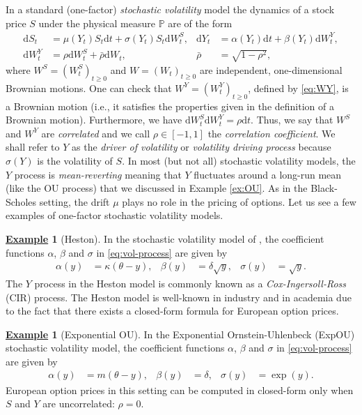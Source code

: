 \documentclass[12pt]{book}
\numberwithin{equation}{chapter}
\theoremstyle{plain}
\numberwithin{theorem}{section}
\theoremstyle{definition}
\newtheorem{example}[theorem]{\underline{Example}}
\numberwithin{exercise}{chapter}
\newcommand{\<}{\langle}
\renewcommand{\>}{\rangle}
\renewcommand{\(}{\left(}
\renewcommand{\)}{\right)}
\renewcommand{\[}{\left[}
\renewcommand{\]}{\right]}
\newcommand\Pb{\mathds{P}}
\newcommand\sig{\sigma}
\newcommand\rhob{\bar{\rho}}
\newcommand\dd{\mathrm{d}}
\theoremstyle{definition}
\numberwithin{question}{section}
\begin{document}
In a standard (one-factor) \textit{stochastic volatility} model the dynamics of a stock price $S$ under the physical measure $\Pb$ are of the form
\begin{align}
\dd S_t 
	&= \mu(Y_t) S_t \dd t + \sigma(Y_t) S_t \dd W_t^S , &
\dd Y_t 
	&= \alpha (Y_t) \dd t + \beta(Y_t) \dd W_t^Y , \label{eq:vol-process} \\
\dd W_t^Y 
	&=	\rho \dd W_t^S + \rhob \dd W_t , &
\rhob
	&=	\sqrt{1-\rho^2} , \label{eq:WY}
\end{align}
where $W^S = (W_t^S)_{t \geq 0}$ and $W = (W_t)_{t \geq 0}$ are independent, one-dimensional Brownian motions.
One can check that $W^Y = (W_t^Y)_{t \geq 0}$, defined by \eqref{eq:WY}, is a Brownian motion (i.e., it satisfies the properties given in the definition of a Brownian motion).  Furthermore, we have $\dd W_t^S \dd W_t^Y = \rho \dd t$.  Thus, we say that $W^S$ and $W^Y$ are \textit{correlated} and we call $\rho \in [-1,1]$ the \textit{correlation coefficient}.
We shall refer to $Y$ as the \textit{driver of volatility} or \textit{volatility driving process} because $\sig(Y)$ is the volatility of $S$.
In most (but not all) stochastic volatility models, the $Y$ process is \textit{mean-reverting} meaning that $Y$ fluctuates around a long-run mean (like the OU process) that we discussed in Example \ref{ex:OU}.  
As in the Black-Scholes setting, the drift $\mu$ plays no role in the pricing of options.
Let us see a few examples of one-factor stochastic volatility models.

\begin{example}[Heston]
\label{ex:heston}
In the stochastic volatility model of \cite{heston1993}, the coefficient functions $\alpha$, $\beta$ and $\sig$ in \eqref{eq:vol-process} are given by
\begin{align}
\alpha(y) 
	&= \kappa (\theta - y), &
\beta(y) 
	&= \delta \sqrt{y}, &
\sigma(y) 
	&= \sqrt{y}.
\end{align}
The $Y$ process in the Heston model is commonly known as a \textit{Cox-Ingersoll-Ross} (CIR) process.
The {Heston model} is well-known in industry and in academia due to the fact that there exists a closed-form formula for European option prices.
\end{example}
	
\begin{example}[Exponential OU]
In the Exponential Ornstein-Uhlenbeck (ExpOU) stochastic volatility model, the coefficient functions $\alpha$, $\beta$ and $\sig$ in \eqref{eq:vol-process} are given by 
\begin{align}
\alpha (y) 
	&= m (\theta - y) , &
\beta(y) 
	&= \delta , &
\sigma(y) 
	&= \exp(y) .
\end{align}
European option prices in this setting can be computed in closed-form only when $S$ and $Y$ are uncorrelated: $\rho = 0$.
\end{example}
	
\end{document}

